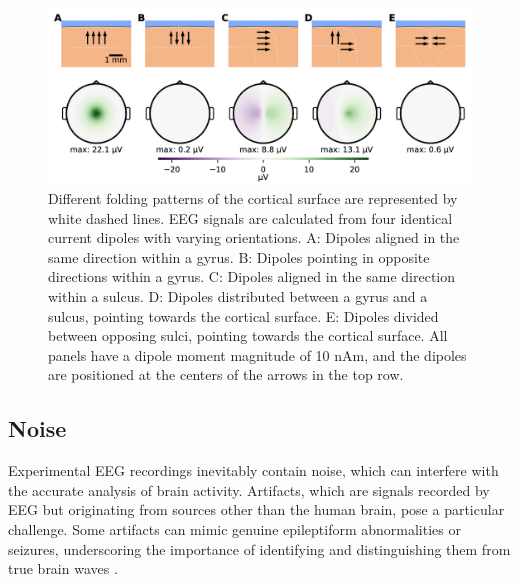 \documentclass[a4paper, UKenglish, 11pt]{uiomaster}
\begin{document}
\begin{figure}[!htb]
    \centering
    \includegraphics[width=\linewidth]{figures/dipole_orientation.png}
    \caption{Different folding patterns of the cortical surface are represented by white dashed lines. EEG signals are calculated from four identical current dipoles with varying orientations. A: Dipoles aligned in the same direction within a gyrus. B: Dipoles pointing in opposite directions within a gyrus. C: Dipoles aligned in the same direction within a sulcus. D: Dipoles distributed between a gyrus and a sulcus, pointing towards the cortical surface. E: Dipoles divided between opposing sulci, pointing towards the cortical surface.
    All panels have a dipole moment magnitude of 10 nAm, and the dipoles are positioned at the centers of the arrows in the top row.}
    \label{fig:dipole_orientation}
\end{figure}



\subsection{Noise}
Experimental EEG recordings inevitably contain noise, which can interfere with the accurate analysis of brain activity. Artifacts, which are signals recorded by EEG but originating from sources other than the human brain, pose a particular challenge. Some artifacts can mimic genuine epileptiform abnormalities or seizures, underscoring the importance of identifying and distinguishing them from true brain waves \cite{sazgar2019eeg}.
\end{document}
